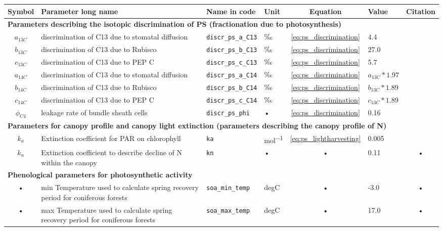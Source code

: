 \begin{table}
\begin{tabularx}{\linewidth}{|c|X|l|l|c|l|c|} %
\hline 
Symbol & Parameter long name & Name in code & Unit & Equation & Value & Citation \\ 
\hline 
\multicolumn{6}{l}{\bf Parameters describing the isotopic discrimination of PS (fractionation due to photosynthesis)}\\
\hline
$a_{13C}$ & discrimination of C13 due to stomatal diffusion & \texttt{discr\_ps\_a\_C13} & $\permil$ & \ref{eq:ps_discrimination} & 4.4 & \cite{Drake:2014dl} \\  
$b_{13C}$ & discrimination of C13 due to Rubisco & \texttt{discr\_ps\_b\_C13} & $\permil$ & \ref{eq:ps_discrimination} & 27.0 & \cite{Drake:2014dl} \\
$c_{13C}$ & discrimination of C13 due to PEP C & \texttt{discr\_ps\_c\_C13} & $\permil$ & \ref{eq:ps_discrimination} & 5.7 & \cite{Drake:2014dl} \\  
$a_{14C}$ & discrimination of C13 due to stomatal diffusion & \texttt{discr\_ps\_a\_C14} & $\permil$ & \ref{eq:ps_discrimination} & $a_{13C} * 1.97$ & \cite{Drake:2014dl} \\    
$b_{14C}$ & discrimination of C13 due to Rubisco & \texttt{discr\_ps\_b\_C14} & $\permil$ & \ref{eq:ps_discrimination} & $b_{13C} * 1.89$ & \cite{Drake:2014dl} \\  
$c_{14C}$ & discrimination of C13 due to PEP C & \texttt{discr\_ps\_c\_C14} & $\permil$ & \ref{eq:ps_discrimination} & $c_{13C} * 1.89$ & \cite{Drake:2014dl} \\    
$\phi_{C4}$ & leakage rate of bundle sheath cells & \texttt{discr\_ps\_phi} & • & \ref{eq:ps_discrimination} & 0.16 & \cite{Drake:2014dl} \\  

\hline 
\multicolumn{6}{l}{\bf Parameters for canopy profile and canopy light extinction (parameters describing the canopy profile of N)}\\
\hline
$k_a$ & Extinction coefficient for PAR on chlorophyll & \texttt{ka} & \unit{mol^{-1}} & \ref{eq:ps_lightharvesting} & 0.005 & \cite{Kull:1998cr} \\  
$k_n$ & Extinction coefficient to describe decline of N within the canopy & \texttt{kn} & • & • & 0.11 & • \\  

\hline 
\multicolumn{6}{l}{\bf Phenological parameters for photosynthetic activity}\\
\hline
• & min Temperature used to calculate spring recovery period for coniferous forests & \texttt{soa\_min\_temp} & degC & • & -3.0 & • \\
• & max Temperature used to calculate spring recovery period for coniferous forests & \texttt{soa\_max\_temp} & degC & • & 17.0 & • \\
\hline 
\end{tabularx}
\end{table}


\pagebreak

\newpage
